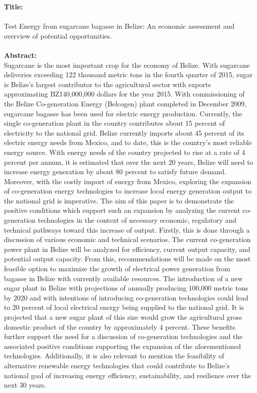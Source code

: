 \documentclass[12pt]{article}
\begin{document}
\noindent
\textbf{Title:} \\
\\Test Energy from sugarcane bagasse in Belize: An economic assessment and overview of potential opportunities. \\ \\
\noindent\textbf{Abstract:}\\
Sugarcane is the most important crop for the economy of Belize. With sugarcane deliveries exceeding 122 thousand metric tons in the fourth quarter of 2015, sugar is Belize's largest contributor to the agricultural sector with exports approximating BZ140,000,000 dollars for the year 2015. With commissioning of the Belize Co-generation Energy (Belcogen) plant completed in December 2009, sugarcane bagasse has been used for electric energy production. Currently, the single co-generation plant in the country contributes about 15 percent of electricity to the national grid. Belize currently imports about 45 percent of its electric energy needs from Mexico, and to date, this is the country's most reliable energy source. With energy needs of the country projected to rise at a rate of 4 percent per annum, it is estimated that over the next 20 years, Belize will need to increase energy generation by about 80 percent to satisfy future demand. Moreover, with the costly import of energy from Mexico, exploring the expansion of co-generation energy technologies to increase local energy generation output to the national grid is imperative. The aim of this paper is to demonstrate the positive conditions which support such an expansion by analyzing the current co-generation technologies in the context of necessary economic, regulatory and technical pathways toward this increase of output. Firstly, this is done through a discussion of various economic and technical scenarios. The current co-generation power plant in Belize will be analyzed for efficiency, current output capacity, and potential output capacity. From this, recommendations will be made on the most feasible option to maximize the growth of electrical power generation from bagasse in Belize with currently available resources. The introduction of a new sugar plant in Belize with projections of annually producing 100,000 metric tons by 2020 and with intentions of introducing co-generation technologies could lead to 20 percent of local electrical energy being supplied to the national grid. It is projected that a new sugar plant of this size would grow the agricultural gross domestic product of the country by approximately 4 percent. These benefits further support the need for a discussion of co-generation technologies and the associated positive conditions supporting the expansion of the aforementioned technologies. Additionally, it is also relevant to mention the feasibility of alternative renewable energy technologies that could contribute to Belize's national goal of increasing energy efficiency, sustainability, and resilience over the next 30 years. 
\end{document}
